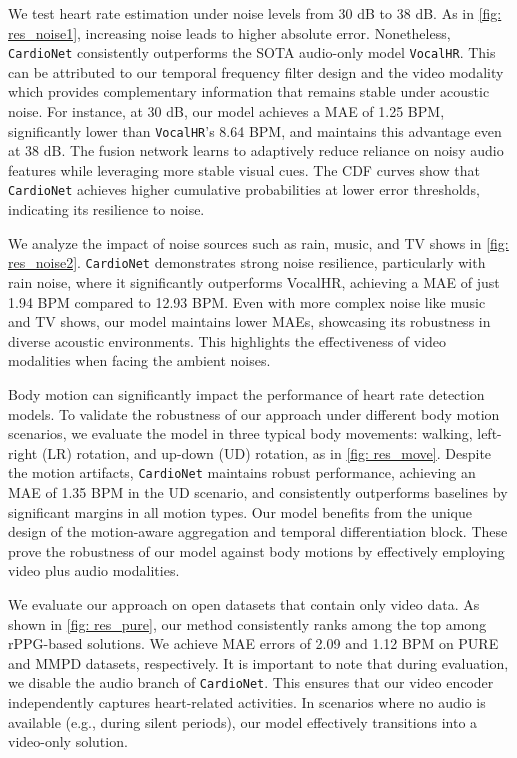 We test heart rate estimation under noise levels from 30 dB to 38 dB. As in \fig\ref{fig: res_noise1}, increasing noise leads to higher absolute error. Nonetheless, \texttt{CardioNet} consistently outperforms the SOTA audio-only model \texttt{VocalHR}. This can be attributed to our temporal frequency filter design and the video modality which provides complementary information that remains stable under acoustic noise. For instance, at 30 dB, our model achieves a MAE of 1.25 BPM, significantly lower than \texttt{VocalHR}'s 8.64 BPM, and maintains this advantage even at 38 dB. The fusion network learns to adaptively reduce reliance on noisy audio features while leveraging more stable visual cues. The CDF curves show that \texttt{CardioNet} achieves higher cumulative probabilities at lower error thresholds, indicating its resilience to noise.


We analyze the impact of noise sources such as rain, music, and TV shows in \fig\ref{fig: res_noise2}. \texttt{CardioNet} demonstrates strong noise resilience, particularly with rain noise, where it significantly outperforms VocalHR, achieving a MAE of just 1.94 BPM compared to 12.93 BPM. 
Even with more complex noise like music and TV shows, our model maintains lower MAEs, showcasing its robustness in diverse acoustic environments. This highlights the effectiveness of video modalities when facing the ambient noises.






Body motion can significantly impact the performance of heart rate detection models. To validate the robustness of our approach under different body motion scenarios, we evaluate the model in three typical body movements: walking, left-right (LR) rotation, and up-down (UD) rotation, as in \fig\ref{fig: res_move}. 
Despite the motion artifacts, \texttt{CardioNet} maintains robust performance, achieving an MAE of 1.35 BPM in the UD scenario, and consistently outperforms baselines by significant margins in all motion types. Our model benefits from the unique design of the motion-aware aggregation and temporal differentiation block.
These prove the robustness of our model against body motions by effectively employing video plus audio modalities.


 We evaluate our approach on open datasets that contain only video data. As shown in \fig\ref{fig: res_pure}, our method consistently ranks among the top among rPPG-based solutions. We achieve MAE errors of 2.09 and 1.12 BPM on PURE and MMPD datasets, respectively.
It is important to note that during evaluation, we disable the audio branch of \texttt{CardioNet}. This ensures that our video encoder independently captures heart-related activities. 
In scenarios where no audio is available (e.g., during silent periods), our model effectively transitions into a video-only solution. 


